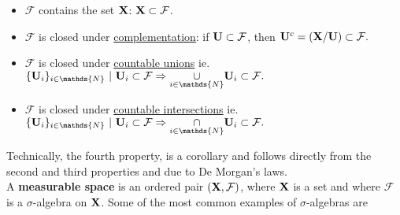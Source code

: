 \documentclass{homework}
\begin{document}
\begin{itemize}
    \item $\mathcal{F}$ contains the set ${\bf X}$: ${\bf X} \subset \mathcal{F}$. \\
    \item { $\mathcal{F}$ is closed under \underline{complementation}: if ${\bf U} \subset \mathcal{F}$, then } $ 
    {\bf U}^c = ({\bf X} / {\bf U}) \subset \mathcal{F}.
    $\\
    \item $\mathcal{F}$ is closed under \underline{countable unions} ie. 
    $\{{\bf U}_i\}_{i \in \mathds{N}} \textnormal{ } | \textnormal{ } {\bf U}_i \subset \mathcal{F} \Rightarrow \underset{i \in \mathds{N}}{\cup} {\bf U}_i \subset \mathcal{F}.
    $\\
    \item $\mathcal{F}$ is closed under \underline{countable intersections} ie. $
    \textnormal{}
    \{{\bf U}_i\}_{i\in \mathds{N}} \textnormal{ } | \textnormal{ } {\bf U}_i \subset \mathcal{F} \Rightarrow \underset{i\in \mathds{N}}{\cap} {\bf U}_i \subset \mathcal{F}. 
    $\\
\end{itemize}

Technically, the fourth property, is a corollary and follows directly from the second and third properties and due to De Morgan's laws. \\

A \textbf{measurable space} is an ordered pair $({\bf X}, \mathcal{F})$, where ${\bf X}$ is a set and where $\mathcal{F}$ is a $\sigma$-algebra on ${\bf X}$. Some of the most common examples of $\sigma$-algebras are
\end{document}

